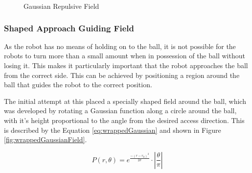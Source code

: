 \documentclass[10pt]{article}
\begin{document}
\begin{figure}
 \centering
 \caption{Gaussian Repulsive Field}
 \label{fig:gaussianField}
\end{figure}

\subsubsection{Shaped Approach Guiding Field\label{sub:Shaped-Approach-Guiding}}

As the robot has no means of holding on to the ball, it is not possible for the
robots to turn more than a small amount when in possession of the ball without
losing it. This makes it particularly important that the robot approaches the
ball from the correct side. This can be achieved by positioning a region around
the ball that guides the robot to the correct position.

The initial attempt at this placed a specially shaped field around the ball,
which was developed by rotating a Gaussian function along a circle around the
ball, with it's height proportional to the angle from the desired access
direction. This is described by the Equation \ref{eq:wrappedGaussian} and shown
in Figure \ref{fig:wrappedGaussianField}.

\begin{equation}
P\left(r,\theta\right)=e^{\frac{-\left(r-r_{0}\right)^{2}}{2\sigma}}\cdot\left|\frac{\theta}{\pi}\right|\label{eq:wrappedGaussian}
\end{equation}
\end{document}
